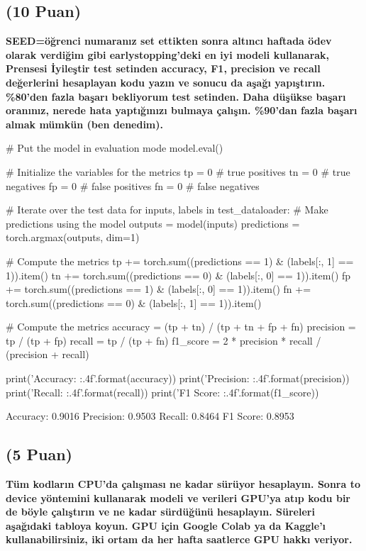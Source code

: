 \documentclass[11pt]{article}
\begin{document}
\subsection{(10 Puan)} \textbf{SEED=öğrenci numaranız set ettikten sonra altıncı haftada ödev olarak verdiğim gibi earlystopping'deki en iyi modeli kullanarak, Prensesi İyileştir test setinden accuracy, F1, precision ve recall değerlerini hesaplayan kodu yazın ve sonucu da aşağı yapıştırın. \%80'den fazla başarı bekliyorum test setinden. Daha düşükse başarı oranınız, nerede hata yaptığınızı bulmaya çalışın. \%90'dan fazla başarı almak mümkün (ben denedim).}

\begin{python}
# Put the model in evaluation mode
model.eval()

# Initialize the variables for the metrics
tp = 0  # true positives
tn = 0  # true negatives
fp = 0  # false positives
fn = 0  # false negatives

# Iterate over the test data
for inputs, labels in test_dataloader:
    # Make predictions using the model
    outputs = model(inputs)
    predictions = torch.argmax(outputs, dim=1)

    # Compute the metrics
    tp += torch.sum((predictions == 1) & (labels[:, 1] == 1)).item()
    tn += torch.sum((predictions == 0) & (labels[:, 0] == 1)).item()
    fp += torch.sum((predictions == 1) & (labels[:, 0] == 1)).item()
    fn += torch.sum((predictions == 0) & (labels[:, 1] == 1)).item()

# Compute the metrics
accuracy = (tp + tn) / (tp + tn + fp + fn)
precision = tp / (tp + fp)
recall = tp / (tp + fn)
f1_score = 2 * precision * recall / (precision + recall)

print('Accuracy: {:.4f}'.format(accuracy))
print('Precision: {:.4f}'.format(precision))
print('Recall: {:.4f}'.format(recall))
print('F1 Score: {:.4f}'.format(f1_score))
\end{python}

Accuracy: 0.9016
Precision: 0.9503
Recall: 0.8464
F1 Score: 0.8953

\subsection{(5 Puan)} \textbf{Tüm kodların CPU'da çalışması ne kadar sürüyor hesaplayın. Sonra to device yöntemini kullanarak modeli ve verileri GPU'ya atıp kodu bir de böyle çalıştırın ve ne kadar sürdüğünü hesaplayın. Süreleri aşağıdaki tabloya koyun. GPU için Google Colab ya da Kaggle'ı kullanabilirsiniz, iki ortam da her hafta saatlerce GPU hakkı veriyor.}
\end{document}
